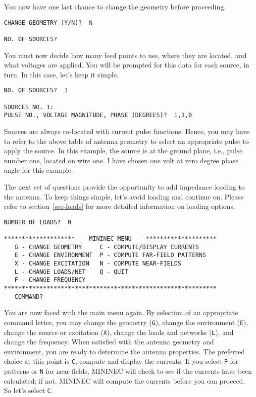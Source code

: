 \documentclass[12pt]{article}
\begin{document}
You now have one last chance to change the geometry before proceeding.

\begin{Verbatim}
CHANGE GEOMETRY (Y/N)?  N

NO. OF SOURCES?
\end{Verbatim}

You must now decide how many feed points to use, where they are located,
and what voltages are applied. You will be prompted for this data for
each source, in turn. In this case, let's keep it simple.

\begin{Verbatim}
NO. OF SOURCES?  1

SOURCES NO. 1:
PULSE NO., VOLTAGE MAGNITUDE, PHASE (DEGREES)?  1,1,0
\end{Verbatim}

Sources are always co-located with current pulse functions. Hence, you
may have to refer to the above table of antenna geometry to select an
appropriate pulse to apply the source. In this example, the source is at
the ground plane, i.e., pulse number one, located on wire one. I have
chosen one volt at zero degree phase angle for this example.

The next set of questions provide the opportunity to add impedance
loading to the antenna. To keep things simple, let's avoid loading and
continue on. Please refer to section~\ref{sec-loads} for more detailed
information on loading options.

\begin{Verbatim}
NUMBER OF LOADS?  0

********************    MININEC MENU    ********************
   G - CHANGE GEOMETRY     C - COMPUTE/DISPLAY CURRENTS
   E - CHANGE ENVIRONMENT  P - COMPUTE FAR-FIELD PATTERNS
   X - CHANGE EXCITATION   N - COMPUTE NEAR-FIELDS
   L - CHANGE LOADS/NET    Q - QUIT
   F - CHANGE FREQUENCY
************************************************************
   COMMAND?
\end{Verbatim}

You are now faced with the main menu again. By selection of an
appropriate command letter, you may change the geometry (\verb+G+),
change the environment (\verb+E+), change the source or excitation
(\verb+X+), change the loads and networks (\verb+L+), and change the
frequency. When satisfied with the antenna geometry and environment, you
are ready to determine the antenna properties. The preferred choice at
this point is \verb+C+, compute and display the currents. If you select
\verb+P+ for patterns or \verb+N+ for near fields, MININEC will check to
see if the currents have been calculated; if not, MININEC will compute
the currents before you can proceed. So let's select \verb+C+.
\end{document}
